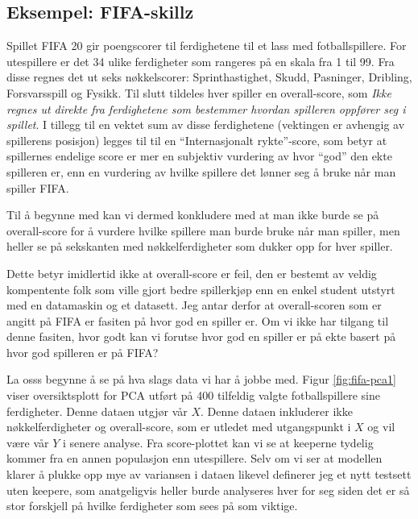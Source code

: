 \subsection{Eksempel: FIFA-skillz}
Spillet FIFA 20 gir poengscorer til ferdighetene til et lass med fotballspillere. For utespillere er det 34 ulike ferdigheter som rangeres på en skala fra 1 til 99. Fra disse regnes det ut seks nøkkelscorer: Sprinthastighet, Skudd, Pasninger, Dribling, Forsvarsspill og Fysikk. Til slutt tildeles hver spiller en overall-score, som \textit{Ikke regnes ut direkte fra ferdighetene som bestemmer hvordan spilleren oppfører seg i spillet}. I tillegg til en vektet sum av disse ferdighetene (vektingen er avhengig av spillerens posisjon) legges til til en ``Internasjonalt rykte''-score, som betyr at spillernes endelige score er mer en subjektiv vurdering av hvor ``god'' den ekte spilleren er, enn en vurdering av hvilke spillere det lønner seg å bruke når man spiller FIFA.

Til å begynne med kan vi dermed konkludere med at man ikke burde se på overall-score for å vurdere hvilke spillere man burde bruke når man spiller, men heller se på sekskanten med nøkkelferdigheter som dukker opp for hver spiller.

Dette betyr imidlertid ikke at overall-score er feil, den er bestemt av veldig kompentente folk som ville gjort bedre spillerkjøp enn en enkel student utstyrt med en datamaskin og et datasett. Jeg antar derfor at overall-scoren som er angitt på FIFA er fasiten på hvor god en spiller er. Om vi ikke har tilgang til denne fasiten, hvor godt kan vi forutse hvor god en spiller er på ekte basert på hvor god spilleren er på FIFA?

La osss begynne å se på hva slags data vi har å jobbe med. Figur \ref{fig:fifa-pca1} viser oversiktsplott for PCA utført på 400 tilfeldig valgte fotballspillere sine ferdigheter. Denne dataen utgjør vår $X$. Denne dataen inkluderer ikke nøkkelferdigheter og overall-score, som er utledet med utgangspunkt i $X$ og vil være vår $Y$ i senere analyse. Fra score-plottet kan vi se at keeperne tydelig kommer fra en annen populasjon enn utespillere. Selv om vi ser at modellen klarer å plukke opp mye av variansen i dataen likevel definerer jeg et nytt testsett uten keepere, som anatgeligvis heller burde analyseres hver for seg siden det er så stor forskjell på hvilke ferdigheter som sees på som viktige. 


